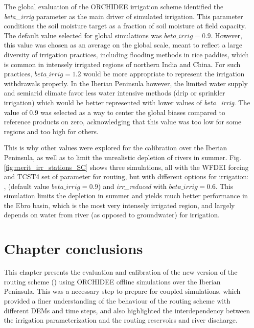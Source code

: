 The global evaluation of the ORCHIDEE irrigation scheme \citep{arboleda-obando_validation_2024} identified the \textit{beta\_irrig} parameter as the main driver of simulated irrigation. This parameter conditions the soil moisture target as a fraction of soil moisture at field capacity. The default value selected for global simulations was $beta\_irrig = 0.9$. However, this value was chosen as an average on the global scale, meant to reflect a large diversity of irrigation practices, including flooding methods in rice paddies, which is common in intensely irrigated regions of northern India and China. For such practices, $beta\_irrig = 1.2$ would be more appropriate to represent the irrigation withdrawals properly. In the Iberian Peninsula however, the limited water supply and semiarid climate favor less water intensive methods (drip or sprinkler irrigation) which would be better represented with lower values of \textit{beta\_irrig}. The value of $0.9$ was selected as a way to center the global biases compared to reference products on zero, acknowledging that this value was too low for some regions and too high for others.

This is why other values were explored for the calibration over the Iberian Peninsula, as well as to limit the unrealistic depletion of rivers in summer. Fig. \ref{fig:merit_irr_stations_SC} shows three simulations, all with the WFDEI forcing and TCST4 set of parameter for routing, but with different options for irrigation: \noirr, \irr (default value $beta\_irrig = 0.9$) and \textit{irr\_reduced} with $beta\_irrig = 0.6$. 
This simulation limits the depletion in summer and yields much better performance in the Ebro basin, which is the most very intensely irrigated region, and largely depends on water from river (as opposed to groundwater) for irrigation.

\pagebreak

\section{Chapter conclusions}

This chapter presents the evaluation and calibration of the new version of the routing scheme (\native) using ORCHIDEE offline simulations  over the Iberian Peninsula. This was a necessary step to prepare for coupled simulations, which provided a finer understanding of the behaviour of the routing scheme with different DEMs and time steps, and also highlighted the interdependency between the irrigation parameterization and the routing reservoirs and river discharge. 

